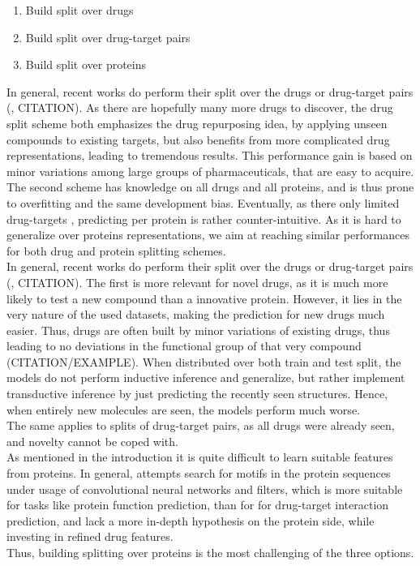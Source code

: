 \documentclass{bioinfo}
\renewcommand{\cite}{\citep}
\begin{document}
\begin{enumerate}
	\item Build split over drugs
	\item Build split over drug-target pairs
	\item Build split over proteins
\end{enumerate} 
In general, recent works do perform their split over the drugs or drug-target pairs (\cite{Survey2018}, CITATION). As there are hopefully many more drugs to discover, the drug split scheme both emphasizes the drug repurposing idea, by applying unseen compounds to existing targets, but also benefits from more complicated drug representations, leading to tremendous results. This performance gain is based on minor variations among large groups of pharmaceuticals, that are easy to acquire. The second scheme has knowledge on all drugs and all proteins, and is thus prone to overfitting and the same development bias. Eventually, as there only limited drug-targets \citep{Overington2006}, predicting per protein is rather counter-intuitive. As it is hard to generalize over proteins representations, we aim at reaching similar performances for both drug and protein splitting schemes. \\

In general, recent works do perform their split over the drugs or drug-target pairs (\cite{Survey2018}, CITATION). The first is more relevant for novel drugs, as it is much more likely to test a new compound than a innovative protein. However, it lies in the very nature of the used datasets, making the prediction for new drugs much easier. Thus, drugs are often built by minor variations of existing drugs, thus leading to no deviations in the functional group of that very compound (CITATION/EXAMPLE). When distributed over both train and test split, the models do not perform inductive inference and generalize, but rather implement transductive inference by just predicting the recently seen structures. Hence, when entirely new molecules are seen, the models perform much worse. \\
The same applies to splits of drug-target pairs, as all drugs were already seen, and novelty cannot be coped with.\\
As mentioned in the introduction it is quite difficult to learn suitable features from proteins. In general, attempts search for motifs in the protein sequences under usage of convolutional neural networks and filters, which is more suitable for tasks like protein function prediction, than for for drug-target interaction prediction, and lack a more in-depth hypothesis on the protein side, while investing in refined drug features. \\
Thus, building splitting over proteins is the most challenging of the three options. \\
\end{document}
